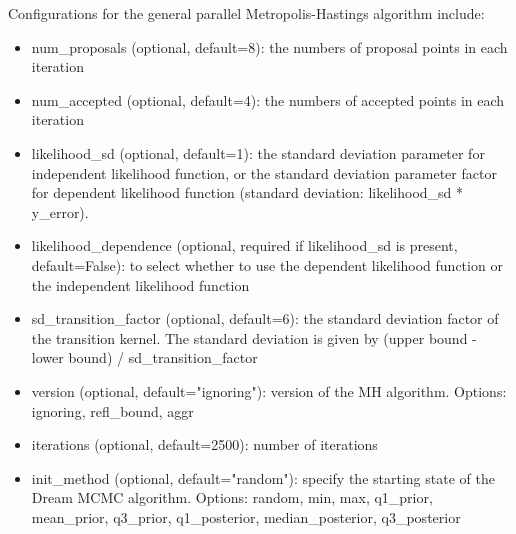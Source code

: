 Configurations for the general parallel Metropolis-Hastings algorithm include:
\begin{itemize}
    \item num\_proposals (optional, default=8): the numbers of proposal points in each iteration
    \item num\_accepted (optional, default=4): the numbers of accepted points in each iteration
    \item likelihood\_sd (optional, default=1): the standard deviation parameter for independent likelihood function, or the standard deviation parameter factor for dependent likelihood function (standard deviation: likelihood\_sd * y\_error).
    \item likelihood\_dependence (optional, required if likelihood\_sd is present, default=False): to select whether to use the dependent likelihood function or the independent likelihood function
    \item sd\_transition\_factor (optional, default=6): the standard deviation factor of the transition kernel. The standard deviation is given by (upper bound - lower bound) / sd\_transition\_factor
    \item version (optional, default="ignoring"): version of the MH algorithm. Options: ignoring, refl\_bound, aggr
    \item iterations (optional, default=2500): number of iterations
    \item init\_method (optional, default="random"): specify the starting state of the Dream MCMC algorithm. Options: random, min, max, q1\_prior, mean\_prior, q3\_prior, q1\_posterior, median\_posterior, q3\_posterior
\end{itemize}

